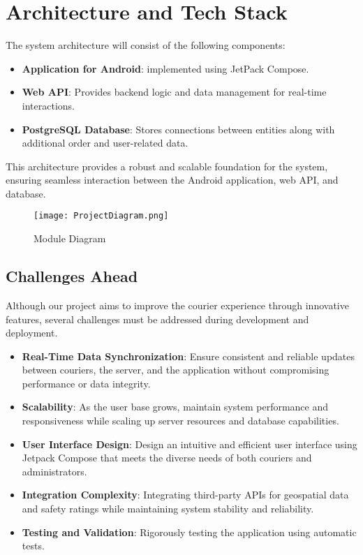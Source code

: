 \documentclass[a4paper,twoside,11pt]{article}
\begin{document}
\newpage

\section*{Architecture and Tech Stack}

The system architecture will consist of the following components:

\begin{itemize}
\item \textbf{Application for Android}: implemented using JetPack Compose.
\item \textbf{Web API}: Provides backend logic and data management for real-time interactions.
\item \textbf{PostgreSQL Database}: Stores connections between entities along with additional order and user-related data.
\end{itemize}

This architecture provides a robust and scalable foundation for the system, ensuring seamless interaction between the Android application, web API, and database.

\begin{figure}[h]
    \centering
    \texttt{[image: ProjectDiagram.png]}
    \caption{Module Diagram}
    \label{fig:project-plan}
\end{figure}

\subsection*{Challenges Ahead}

Although our project aims to improve the courier experience through innovative features, several challenges must be addressed during development and deployment.

\begin{itemize}
\item \textbf{Real-Time Data Synchronization}: Ensure consistent and reliable updates between couriers, the server, and the application without compromising performance or data integrity.

\item \textbf{Scalability}: As the user base grows, maintain system performance and responsiveness while scaling up server resources and database capabilities.

\item \textbf{User Interface Design}: Design an intuitive and efficient user interface using Jetpack Compose that meets the diverse needs of both couriers and administrators.

\item \textbf{Integration Complexity}: Integrating third-party APIs for geospatial data and safety ratings while maintaining system stability and reliability.

\item \textbf{Testing and Validation}: Rigorously testing the application using automatic tests.
\end{itemize}
\end{document}
